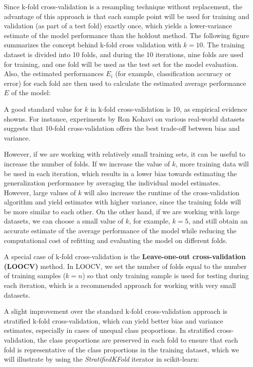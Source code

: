 \documentclass[11pt]{article}
\begin{document}
Since k-fold cross-validation is a resampling technique without
replacement, the advantage of this approach is that each sample point
will be used for training and validation (as part of a test fold)
exactly once, which yields a lower-variance estimate of the model
performance than the holdout method. The following figure summarizes the
concept behind k-fold cross validation with \(k=10\). The training
dataset is divided into 10 folds, and during the 10 iterations, nine
folds are used for training, and one fold will be used as the test set
for the model evaluation. Also, the estimated performances \(E_i\) (for
example, classification accuracy or error) for each fold are then used
to calculate the estimated average performance \(E\) of the model:

A good standard value for \(k\) in k-fold cross-validation is 10, as
empirical evidence showns. For instance, experiments by Ron Kohavi on
various real-world datasets suggests that 10-fold cross-validation
offers the best trade-off between bias and variance.

However, if we are working with relatively small training sets, it can
be useful to increase the number of folds. If we increase the value of
\(k\), more training data will be used in each iteration, which results
in a lower bias towards estimating the generalization performance by
averaging the individual model estimates. However, large values of \(k\)
will also increase the runtime of the cross-validation algorithm and
yield estimates with higher variance, since the training folds will be
more similar to each other. On the other hand, if we are working with
large datasets, we can choose a small value of \(k\), for example,
\(k=5\), and still obtain an accurate estimate of the average
performance of the model while reducing the computational cost of
refitting and evaluating the model on different folds.

A special case of k-fold cross-validation is the \textbf{Leave-one-out
cross-validation (LOOCV)} method. In LOOCV, we set the number of folds
equal to the number of training samples (\(k = n\)) so that only
training sample is used for testing during each iteration, which is a
recommended approach for working with very small datasets.

A slight improvement over the standard k-fold cross-validation approach
is stratified k-fold cross-validation, which can yield better bias and
variance estimates, especially in cases of unequal class proportions. In
stratified cross-validation, the class proportions are preserved in each
fold to ensure that each fold is representative of the class proportions
in the training dataset, which we will illustrate by using the
\emph{StratifiedKFold} iterator in scikit-learn:
\end{document}

